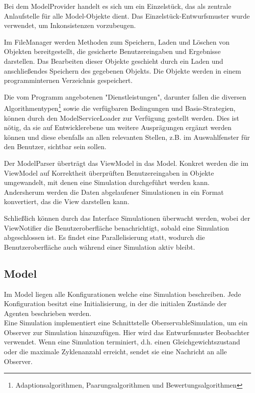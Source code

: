 Bei dem ModelProvider handelt es sich um ein Einzelstück, das als zentrale Anlaufstelle für alle Model-Objekte dient. Das Einzelstück-Entwurfsmuster wurde verwendet, um Inkonsistenzen vorzubeugen.

Im FileManager werden Methoden zum Speichern, Laden und Löschen von Objekten bereitgestellt, die gesicherte Benutzereingaben und Ergebnisse darstellen. Das Bearbeiten dieser Objekte geschieht durch ein Laden und anschließendes Speichern des gegebenen Objekts.
Die Objekte werden in einem programminternen Verzeichnis gespeichert.

Die vom Programm angebotenen "Dienstleistungen", darunter fallen die diversen Algorithmentypen\footnote{Adaptionsalgorithmen, Paarungsalgorithmen und Bewertungsalgorithmen} sowie die verfügbaren Bedingungen und Basis-Strategien, können durch den ModelServiceLoader zur Verfügung gestellt werden.
Dies ist nötig, da sie auf Entwicklerebene um weitere Ausprägungen ergänzt werden können und diese ebenfalls an allen relevanten Stellen, z.B. im Auswahlfenster für den Benutzer, sichtbar sein sollen.

Der ModelParser überträgt das ViewModel in das Model. Konkret werden die im ViewModel auf Korrektheit überprüften Benutzereingaben in Objekte umgewandelt, mit denen eine Simulation durchgeführt werden kann. Andersherum werden die Daten abgelaufener Simulationen in ein Format konvertiert, das die View darstellen kann.

Schließlich können durch das Interface Simulationen überwacht werden, wobei der ViewNotifier die Benutzeroberfläche benachrichtigt, sobald eine Simulation abgeschlossen ist. Es findet eine Parallelisierung statt, wodurch die Benutzeroberfläche auch während einer Simulation aktiv bleibt.

\subsection{Model}

\noindent
{}


Im Model liegen alle Konfigurationen welche eine Simulation beschreiben. Jede Konfiguration besitzt eine Initialisierung, in der die initialen Zustände der Agenten beschrieben werden. \\

Eine Simulation implementiert eine Schnittstelle OberservableSimulation, um ein Observer zur Simulation hinzuzufügen. Hier wird das Entwurfsmuster Beobachter verwendet. Wenn eine Simulation terminiert, d.h. einen Gleichgewichtszustand oder die maximale Zyklenanzahl erreicht, sendet sie eine Nachricht an alle Observer.

